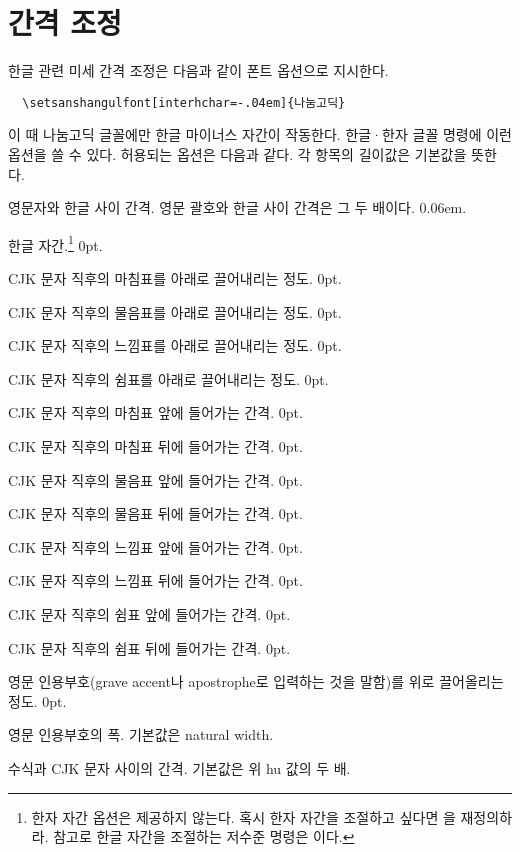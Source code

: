 \documentclass[a4paper]{article}
\begin{document}
\section{간격 조정}
한글 관련 미세 간격 조정은 다음과 같이 폰트 옵션으로 지시한다.
\begin{verbatim}
  \setsanshangulfont[interhchar=-.04em]{나눔고딕}
\end{verbatim}
이 때 나눔고딕 글꼴에만 한글 마이너스 자간이 작동한다.
 한글·한자 글꼴
명령에 이런 옵션을 쓸 수 있다.
허용되는 옵션은 다음과 같다. 각 항목의 길이값은 기본값을 뜻한다.
\begin{description}\itemsep0pt
\item[hu]
영문자와 한글 사이 간격. 영문 괄호와 한글 사이 간격은 그 두 배이다. 0.06em.
\item[interhchar]
한글 자간.\footnote{한자 자간 옵션은 제공하지 않는다.
  혹시 한자 자간을 조절하고 싶다면
  \texttt{\string\XKinterhanjabreak}을 재정의하라.
  참고로 한글 자간을 조절하는 저수준 명령은
  \texttt{\string\XKinterhangulbreak} 이다.}
0pt.
\item[lowerperiod]
CJK 문자 직후의 마침표를 아래로 끌어내리는 정도. 0pt.
\item[lowerquestion]
CJK 문자 직후의 물음표를 아래로 끌어내리는 정도. 0pt.
\item[lowerexclamation]
CJK 문자 직후의 느낌표를 아래로 끌어내리는 정도. 0pt.
\item[lowercomma]
CJK 문자 직후의 쉼표를 아래로 끌어내리는 정도. 0pt.
\item[preperiodkern]
CJK 문자 직후의 마침표 앞에 들어가는 간격. 0pt.
\item[postperiodkern]
CJK 문자 직후의 마침표 뒤에 들어가는 간격. 0pt.
\item[prequestionkern]
CJK 문자 직후의 물음표 앞에 들어가는 간격. 0pt.
\item[postquestionkern]
CJK 문자 직후의 물음표 뒤에 들어가는 간격. 0pt.
\item[preexclamationkern]
CJK 문자 직후의 느낌표 앞에 들어가는 간격. 0pt.
\item[postexclamationkern]
CJK 문자 직후의 느낌표 뒤에 들어가는 간격. 0pt.
\item[precommakern]
CJK 문자 직후의 쉼표 앞에 들어가는 간격. 0pt.
\item[postcommakern]
CJK 문자 직후의 쉼표 뒤에 들어가는 간격. 0pt.
\item[quoteraise]
영문 인용부호{\small(grave accent나 apostrophe로 입력하는 것을 말함)}를
위로 끌어올리는 정도. 0pt.
\item[quotewidth]
영문 인용부호의 폭. 기본값은 natural width.
\item[postmathskip]
수식과 CJK 문자 사이의 간격.  기본값은 위 hu 값의 두 배.
\end{description}
\end{document}
